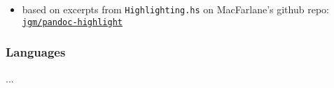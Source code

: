 \documentclass[letterpaper]{scrartcl}
\newenvironment{Shaded}{\begin{snugshade}}{\end{snugshade}}
\newcommand{\FunctionTok}[1]{\textcolor[rgb]{0.94,0.94,0.56}{{#1}}}
\begin{document}
\begin{itemize}
\itemsep1pt\parskip0pt
\item
  based on excerpts from \texttt{Highlighting.hs} on MacFarlane's github
  repo:
  \href{https://github.com/jgm/pandoc-highlight/blob/master/Text/Pandoc/Highlighting.hs}{\texttt{jgm/pandoc-highlight}}
\end{itemize}

\subsubsection{Languages}\label{languages}

\begin{Shaded}
\begin{Highlighting}[]

\FunctionTok{...}


\end{Highlighting}
\end{Shaded}
\end{document}
